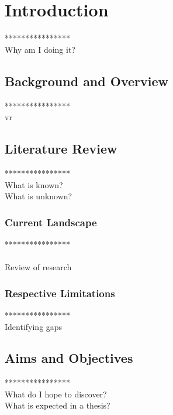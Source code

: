 \label{chapter-introduction}
\chapter{Introduction}

****************\\
Why am I doing it?\\

\section{Background and Overview}

****************\\
vr\\

\section{Literature Review}

****************\\
What is known?\\
What is unknown?\\

\subsection{Current Landscape}

****************\\
\\Review of research\\

\subsection{Respective Limitations}

****************\\
Identifying gaps\\

\section{Aims and Objectives}

****************\\
What do I hope to discover?\\
What is expected in a thesis?\\

